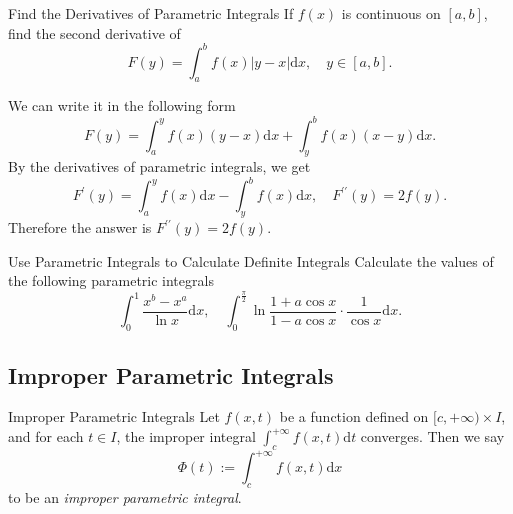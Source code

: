 \begin{example}{Find the Derivatives of Parametric Integrals}{}
  If $f(x)$ is continuous on $[a, b]$, find the second derivative of
  \begin{equation}
    F(y) = \int_a^b f(x) |y - x| \mathrm{d} x, \quad y \in [a, b].
  \end{equation}
\end{example}

\begin{solution}
  We can write it in the following form
  \begin{equation}
    F(y) = \int_a^y f(x)(y-x)\mathrm{d} x + \int_y^b f(x)(x-y)\mathrm{d} x.
  \end{equation}
  By the derivatives of parametric integrals, we get
  \begin{equation}
    F^{\prime}(y) = \int_a^y f(x)\mathrm{d} x- \int_y^bf(x)\mathrm{d}x, \quad
    F^{\prime\prime}(y) = 2f(y).
  \end{equation}
  Therefore the answer is $F^{\prime\prime}(y) = 2f(y)$.
\end{solution}

\begin{example}{Use Parametric Integrals to Calculate Definite Integrals}{}
  Calculate the values of the following parametric integrals
  \begin{equation}
    \int_0^1 \frac{x^b - x^a}{\ln x}\mathrm{d} x, \quad
    \int_0^{\frac{\pi}{2}} \ln \frac{1 + a \cos x}{1 - a \cos x} \cdot \frac{1}{\cos x}\mathrm{d} x.
  \end{equation}
\end{example}

\begin{solution}
  
\end{solution}

\subsection{Improper Parametric Integrals}

\begin{definition}{Improper Parametric Integrals}{}
  Let $f(x, t)$ be a function defined on $[c, +\infty) \times I$,
  and for each $t \in I$, the improper integral
  $\int_c^{+\infty}f(x,t)\mathrm{d}t$ converges.
  Then we say
  \begin{equation}
    \Phi(t) := \int_c^{+\infty} f(x, t)\mathrm{d} x
  \end{equation}
  to be an \emph{improper parametric integral}.
\end{definition}

